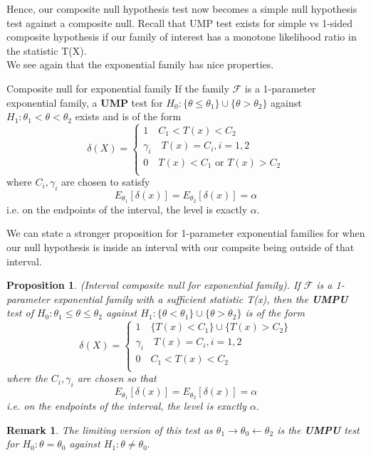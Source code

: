 \documentclass[twoside]{article}
\newtheorem{proposition}[theorem]{Proposition}
\newtheorem{remark}[theorem]{Remark}
\begin{document}
Hence, our composite null hypothesis test now becomes a simple null hypothesis test against a composite null. Recall that UMP test exists for simple vs 1-sided composite hypothesis if our family of interest has a monotone likelihood ratio in the statistic T(X).\\
We see again that the exponential family has nice properties.
\begin{proposition_exam}{Composite null for exponential family}{} If the family $\mathcal{F}$ is a 1-parameter exponential family, a \textbf{UMP} test for $H_0: \{ \theta \leq \theta_1 \} \cup  \{ \theta > \theta_2\}$ against $H_1: \theta_1 < \theta < \theta_2$ exists and is of the form 
$$
\delta(X) = 
\begin{cases}
1 \quad C_1 < T(x) < C_2 \\
\gamma_i \quad T(x) = C_i, i=1,2 \\
0 \quad T(x) < C_1 \text{ or } T(x) > C_2\\
\end{cases}
$$
where $C_i, \gamma_i$ are chosen to satisfy 
$$
E_{\theta_{1}}[\delta(x)] = E_{\theta_{2}}[\delta(x)] = \alpha
$$
i.e. on the endpoints of the interval, the level is exactly $\alpha.$
\end{proposition_exam}
\newpage
We can state a stronger proposition for 1-parameter exponential families for when our null hypothesis is inside an interval with our compsite being outside of that interval.

\begin{proposition}(Interval composite null for exponential family). If $\mathcal{F}$ is a 1-parameter exponential family with a sufficient statistic T(x), then the \textbf{UMPU} test of $H_0: \theta_1 \leq \theta \leq \theta_2$ against $H_1: \{ \theta < \theta_1 \} \cup \{\theta > \theta_2\}$ is of the form 
$$
\delta(X) = 
\begin{cases}
1 \quad  \{T(x) < C_1 \} \cup \{T(x) > C_2 \}\\
\gamma_i \quad T(x) = C_i, i=1,2 \\
0 \quad C_1 < T(x) < C_2\\
\end{cases}
$$
where the $C_i, \gamma_i$ are chosen so that 
$$
E_{\theta_{1}}[\delta(x)] = E_{\theta_{2}}[\delta(x)] = \alpha
$$
i.e. on the endpoints of the interval, the level is exactly $\alpha.$
\end{proposition}

\begin{remark}The limiting version of this test as $\theta_1 \rightarrow \theta_0 \leftarrow \theta_2$ is the \textbf{UMPU} test for $H_0: \theta = \theta_0$ against $H_1: \theta \neq \theta_0.$
\end{remark}
\end{document}
